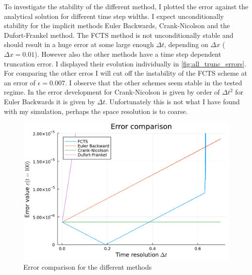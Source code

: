 \documentclass[
	a4paper, %
	10pt, %
]{CSUniSchoolLabReport}
\begin{document}
To investigate the stability of the different method, I plotted the error against the analytical solution for different time step widths. I expect unconditionally stability for the implicit methods Euler Backwards, Crank-Nicolson and the Dufort-Frankel method. The FCTS method is not unconditionally stable and should result in a huge error at some large enough $\Delta t$, depending on $\Delta x$ ($\Delta x = 0.01$). However also the other methods have a time step dependent truncation error. I displayed their evolution individually in \autoref{fig:all_trunc_errors}.
For comparing the other erros I will cut off the instability of the FCTS scheme at an error of $\epsilon = 0.007$. I observe that the other schemes seem stable in the tested regime. In \cite{GBV-1778472117} the error development for Crank-Nicolson is given by order of $\Delta t^2$ for Euler Backwards it is given by $\Delta t$. Unfortunately this is not what I have found with my simulation, perhaps the space resolution is to coarse.

\begin{figure}[H]
	\centering
	\includegraphics[width=\textwidth]{../saves_t2/error_comp_diffusion.pdf}
	\caption{Error comparison for the different methods}
\end{figure}
\end{document}
